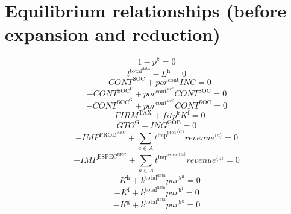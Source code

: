\section{Equilibrium relationships (before expansion and reduction)}

\begin{equation}
1 - p^{\mathrm{k}} = 0
\end{equation}
\begin{equation}
l^{\mathrm{total}^{\mathrm{data}}} - L^{\mathrm{h}} = 0
\end{equation}
\begin{equation}
-{C\!O\!N\!T}^{\mathrm{SOC}} + {{p\!o\!r}^{\mathrm{cont}}} {{I\!N\!C}} = 0
\end{equation}
\begin{equation}
-{C\!O\!N\!T}^{\mathrm{SOC}^{\mathrm{F}}} + {{p\!o\!r}^{\mathrm{cont}^{\mathrm{soc}^{\mathrm{f}}}}} {{C\!O\!N\!T}^{\mathrm{SOC}}} = 0
\end{equation}
\begin{equation}
-{C\!O\!N\!T}^{\mathrm{SOC}^{\mathrm{G}}} + {{p\!o\!r}^{\mathrm{cont}^{\mathrm{soc}^{\mathrm{g}}}}} {{C\!O\!N\!T}^{\mathrm{SOC}}} = 0
\end{equation}
\begin{equation}
-{F\!I\!R\!M}^{\mathrm{TAX}} + {{f\!i\!t}} {p^{\mathrm{k}}} {K^{\mathrm{f}}} = 0
\end{equation}
\begin{equation}
{G\!T\!O}^{\mathrm{G}} - {I\!N\!G}^{\mathrm{GOB}} = 0
\end{equation}
\begin{equation}
-{I\!M\!P}^{\mathrm{PROD}^{\mathrm{REC}}} + \sum_{a\in A} {{t^{\mathrm{imp}^{\mathrm{prod}}}}^{\langle a\rangle}} {{{r\!e\!v\!e\!n\!u\!e}}^{\langle a\rangle}} = 0
\end{equation}
\begin{equation}
-{I\!M\!P}^{\mathrm{ESPEC}^{\mathrm{REC}}} + \sum_{a\in A} {{t^{\mathrm{imp}^{\mathrm{espec}}}}^{\langle a\rangle}} {{{r\!e\!v\!e\!n\!u\!e}}^{\langle a\rangle}} = 0
\end{equation}
\begin{equation}
-K^{\mathrm{h}} + {k^{\mathrm{total}^{\mathrm{data}}}} {{p\!a\!r}^{\mathrm{k}^{\mathrm{h}}}} = 0
\end{equation}
\begin{equation}
-K^{\mathrm{f}} + {k^{\mathrm{total}^{\mathrm{data}}}} {{p\!a\!r}^{\mathrm{k}^{\mathrm{f}}}} = 0
\end{equation}
\begin{equation}
-K^{\mathrm{g}} + {k^{\mathrm{total}^{\mathrm{data}}}} {{p\!a\!r}^{\mathrm{k}^{\mathrm{g}}}} = 0
\end{equation}
